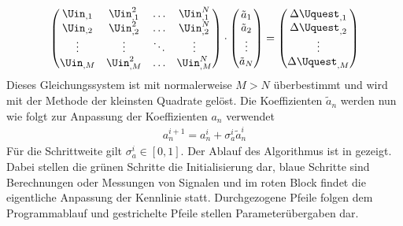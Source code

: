 \documentclass[../Report.tex]{subfiles}
\begin{document}
\begin{align}
	\left( 
	\begin{matrix}
	 	\Uin_{,1} & \Uin_{,1}^2 & \dots & \Uin_{,1}^N \\
		\Uin_{,2} & \Uin_{,2}^2 & \dots & \Uin_{,2}^N \\
		\vdots & \vdots & \ddots & \vdots \\
		\Uin_{,M} & \Uin_{,M}^2 & \dots & \Uin_{,M}^N \\
	\end{matrix}
	\right)
	\cdot
	\left(
	\begin{matrix}
		\tilde{a}_1 \\
		\tilde{a}_2 \\
		\vdots \\
		\tilde{a}_N \\	 
	\end{matrix}
	\right) = \left( 
	\begin{matrix}
		\Delta \Uquest_{,1} \\
		\Delta \Uquest_{,2} \\
		\vdots \\
		\Delta \Uquest_{,M} \\	 
	\end{matrix}
	\right)
	\label{eq:Uquest.Gleichungssystem}
\end{align}
Dieses Gleichungssystem ist mit normalerweise $M>N$ überbestimmt und wird mit der Methode der kleinsten Quadrate gelöst. Die Koeffizienten $\tilde{a}_n$ werden nun wie folgt zur Anpassung der Koeffizienten $a_n$ verwendet
\begin{align}
	\label{eq:opt.adjusta}
	a_n^{i+1} = a_n^{i} + \sigma_{a}^{i} \tilde{a}_n^{i}
\end{align}
Für die Schrittweite gilt $\sigma_{a}^i \in \left[ 0 , 1 \right]$. Der Ablauf des Algorithmus ist in  gezeigt. Dabei stellen die grünen Schritte die Initialisierung dar, blaue Schritte sind Berechnungen oder Messungen von Signalen und im roten Block findet die eigentliche Anpassung der Kennlinie statt. Durchgezogene Pfeile folgen dem Programmablauf und gestrichelte Pfeile stellen Parameterübergaben dar.
\end{document}
